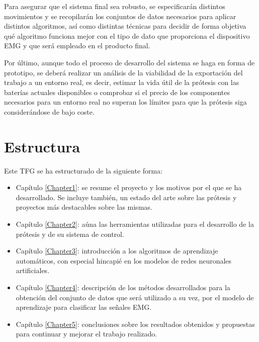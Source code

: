 Para asegurar que el sistema final sea robusto, se especificarán distintos
movimientos y se recopilarán los conjuntos de datos necesarios para aplicar distintos
algoritmos, así como distintas técnicas para decidir de forma objetiva qué algoritmo
funciona mejor con el tipo de dato que proporciona el dispositivo EMG y que será empleado
en el producto final.

Por último, aunque todo el proceso de desarrollo del sistema se haga en forma
de prototipo, se deberá realizar un análisis de la viabilidad de la exportación
del trabajo a un entorno real, es decir, estimar la vida útil de la prótesis con
las baterías actuales disponibles o comprobar si el precio de los componentes
necesarios para un entorno real no superan los límites para que la prótesis siga
considerándose de bajo coste.


\section{Estructura}
\label{sec:estructura}

Este TFG se ha estructurado de la siguiente forma:

\begin{itemize}
	\item Capítulo \ref{Chapter1}: se resume el proyecto y los motivos por el que se ha desarrollado. Se incluye también, un estado del arte sobre las prótesis y proyectos más destacables sobre las mismas.
	\item Capítulo \ref{Chapter2}: aúna las herramientas utilizadas para el desarrollo de la prótesis y de su sistema de control.
	\item Capítulo \ref{Chapter3}: introducción a los algoritmos de aprendizaje automáticos, con especial hincapié en  los modelos de redes neuronales artificiales.
	\item Capítulo \ref{Chapter4}: descripción de los métodos desarrollados para la obtención del conjunto de datos que será utilizado a su vez, por el modelo de aprendizaje para clasificar las señales EMG.
	\item Capítulo \ref{Chapter5}: conclusiones sobre los resultados obtenidos y propuestas para continuar y mejorar el trabajo realizado.
\end{itemize}
